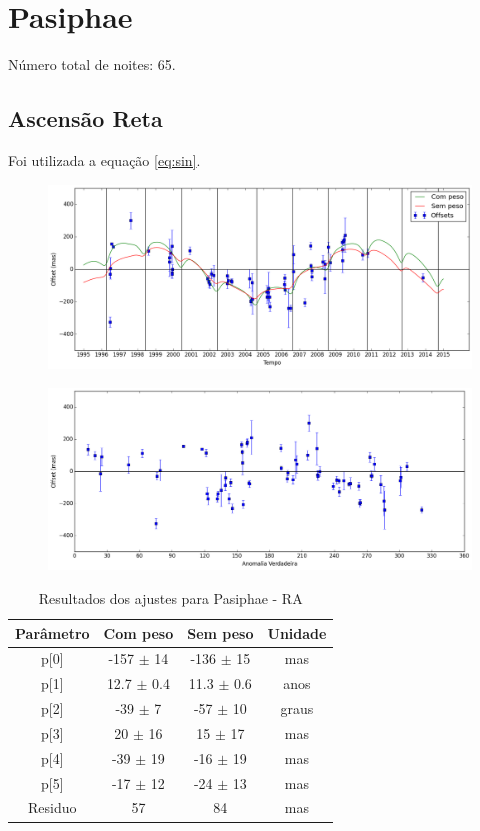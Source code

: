 \documentclass[11pt,a4paper]{report}
\begin{document}
\chapter*{Pasiphae}

\indent \indent Número total de noites: 65.

\section*{Ascensão Reta}

Foi utilizada a equação \ref{eq:sin}.

\begin{figure}[h]
\includegraphics[scale=0.45]{Pasiphae/RA.png} 
\end{figure}

\begin{figure}[h]
\includegraphics[scale=0.45]{Pasiphae/RA_anom.png}  
\end{figure}

\begin{table}[h!]
\caption{\label{Tab: Pasiphae-RA} Resultados dos ajustes para Pasiphae - RA}
\begin{centering}
\begin{tabular}{cccc}
\hline
\hline
Parâmetro & Com peso & Sem peso & Unidade\tabularnewline
\hline
p[0] & -157 $\pm$ 14 & -136 $\pm$ 15 & mas\\
p[1] & 12.7 $\pm$ 0.4 & 11.3 $\pm$ 0.6 & anos\\
p[2] & -39 $\pm$ 7 & -57 $\pm$ 10 & graus\\
p[3] & 20 $\pm$ 16 & 15 $\pm$ 17 & mas\\
p[4] & -39 $\pm$ 19 & -16 $\pm$ 19 & mas\\
p[5] & -17 $\pm$ 12 & -24 $\pm$ 13 & mas\\
Residuo & 57 & 84 & mas\\
\hline 
\end{tabular} 
\par\end{centering}
\end{table}
\end{document}
